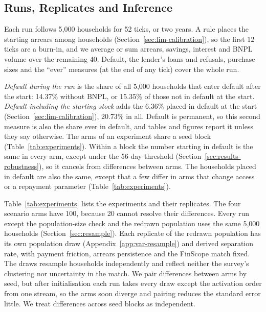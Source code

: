 \subsection{Runs, Replicates and Inference}
\label{sec:sim-params}

Each run follows 5{,}000 households for 52 ticks, or two years. A rule places the starting
arrears among households (Section~\ref{sec:lim-calibration}), so the first 12 ticks are a
burn-in, and we average or sum arrears, savings, interest and \ac{BNPL} volume over the
remaining 40. Default, the lender's loans and refusals, purchase sizes and the ``ever''
measures (at the end of any tick) cover the whole run.

\emph{Default during the run} is the share of all 5{,}000
households that enter default after the start: 14.37\% without \ac{BNPL}, or 15.35\% of those
not in default at the start. \emph{Default including the starting stock} adds the 6.36\% placed
in default at the start (Section~\ref{sec:lim-calibration}), 20.73\% in all. Default is
permanent, so this second measure is also the share ever in default, and tables and figures
report it unless they say otherwise. The arms of an experiment share a seed block
(Table~\ref{tab:experiments}). Within a block the number starting in default is the same in
every arm, except under the 56-day threshold (Section~\ref{sec:results-robustness}), so it
cancels from differences between arms. The households placed in default are also the same,
except that a few differ in arms that change access or a repayment parameter
(Table~\ref{tab:experiments}).

Table~\ref{tab:experiments} lists the experiments and their replicates. The four scenario arms
have 100, because 20 cannot resolve their differences. Every run except the
population-size check and the redrawn population uses the same 5{,}000 households
(Section~\ref{sec:resample}). Each replicate of the redrawn population has its own population
draw (Appendix~\ref{app:var-resample}) and derived separation rate, with payment friction,
arrears persistence and the \ac{FinScope} match fixed. The draws resample households
independently and reflect neither the survey's clustering nor uncertainty in the match.
We pair differences between arms by seed, but after initialisation each run takes every draw
except the activation order from one stream, so the arms soon diverge and pairing reduces the
standard error little. We treat differences across seed blocks as independent.

